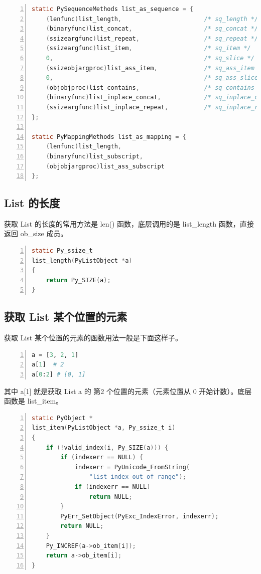 \begin{lstlisting}[language=C, numbers=left, numbersep=1em, numberstyle=\footnotesize , breaklines=true]
static PySequenceMethods list_as_sequence = {
    (lenfunc)list_length,                       /* sq_length */
    (binaryfunc)list_concat,                    /* sq_concat */
    (ssizeargfunc)list_repeat,                  /* sq_repeat */
    (ssizeargfunc)list_item,                    /* sq_item */
    0,                                          /* sq_slice */
    (ssizeobjargproc)list_ass_item,             /* sq_ass_item */
    0,                                          /* sq_ass_slice */
    (objobjproc)list_contains,                  /* sq_contains */
    (binaryfunc)list_inplace_concat,            /* sq_inplace_concat */
    (ssizeargfunc)list_inplace_repeat,          /* sq_inplace_repeat */
};

static PyMappingMethods list_as_mapping = {
    (lenfunc)list_length,
    (binaryfunc)list_subscript,
    (objobjargproc)list_ass_subscript
};
\end{lstlisting}

\subsection{List 的长度}

获取 List 的长度的常用方法是 len() 函数，底层调用的是 list\_length 函数，直接返回 ob\_size 成员。
\begin{lstlisting}[language=C, numbers=left, numbersep=1em, numberstyle=\footnotesize , breaklines=true]
static Py_ssize_t
list_length(PyListObject *a)
{
    return Py_SIZE(a);
}
\end{lstlisting}

\subsection{获取 List 某个位置的元素}

获取 List 某个位置的元素的函数用法一般是下面这样子。

\begin{lstlisting}[language=Python, numbers=left, numbersep=1em, numberstyle=\footnotesize , breaklines=true]
a = [3, 2, 1]
a[1]  # 2
a[0:2] # [0, 1]
\end{lstlisting}

其中 a[1] 就是获取 List a 的 第2 个位置的元素（元素位置从 0 开始计数）。底层函数是 list\_item。

\begin{lstlisting}[language=C, numbers=left, numbersep=1em, numberstyle=\footnotesize , breaklines=true]
static PyObject *
list_item(PyListObject *a, Py_ssize_t i)
{
    if (!valid_index(i, Py_SIZE(a))) {
        if (indexerr == NULL) {
            indexerr = PyUnicode_FromString(
                "list index out of range");
            if (indexerr == NULL)
                return NULL;
        }
        PyErr_SetObject(PyExc_IndexError, indexerr);
        return NULL;
    }
    Py_INCREF(a->ob_item[i]);
    return a->ob_item[i];
}
\end{lstlisting}


